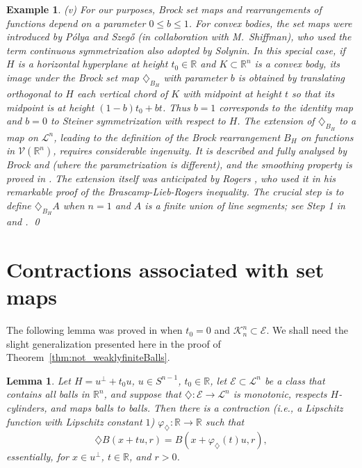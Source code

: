 \documentclass[12pt,reqno]{amsart}
\newcommand{\R}{{\mathbb R}}
\newcommand{\cL}{\mathcal L}
\newcommand{\cV}{{\mathcal V}}
\newtheorem{lem}[thm]{Lemma}
\newtheorem{ex}[thm]{Example}
\newcommand{\di}{\diamondsuit}
\numberwithin{equation}{section}
\begin{document}
\begin{ex}
{(v) For our purposes, {\em Brock} set maps and rearrangements of functions depend on a parameter $0\le b\le 1$.  For convex bodies, the set maps were introduced by P\'olya and Szeg\H{o} \cite[Note~B]{PS} (in collaboration with M.~Shiffman), who used the term {\em continuous symmetrization} also adopted by Solynin.  In this special case, if $H$ is a horizontal hyperplane at height $t_0\in \R$ and $K\subset \R^n$ is a convex body, its image under the Brock set map $\di_{B_H}$ with parameter $b$ is obtained by translating orthogonal to $H$ each vertical chord of $K$ with midpoint at height $t$ so that its midpoint is at height $(1-b)t_0+bt$.  Thus $b=1$ corresponds to the identity map and $b=0$ to Steiner symmetrization with respect to $H$.  The extension of $\di_{B_H}$ to a map on $\cL^n$, leading to the definition of the Brock rearrangement $B_H$ on functions in ${\cV}(\R^n)$, requires considerable ingenuity.  It is described and fully analysed by Brock \cite[Sections~2 and~3]{Bro1} and \cite[Section~2]{Bro2} (where the parametrization is different), and the smoothing property is proved in \cite[Remark~2.3]{Bro2}.  The extension itself was anticipated by Rogers \cite{Rog57}, who used it in his remarkable proof of the Brascamp-Lieb-Rogers inequality.  The crucial step is to define $\di_{B_H}A$ when $n=1$ and $A$ is a finite union of line segments; see Step 1 in \cite[pp.~165--166]{Bro2} and \cite[pp.~106--107]{Rog57}.
\qed}
\end{ex}


\section{Contractions associated with set maps}\label{Contractions}

The following lemma was proved in \cite[Lemma~6.2]{BGGK1} when $t_0=0$ and ${\mathcal{K}}^n_n\subset {\mathcal{E}}$.  We shall need the slight generalization presented here in the proof of Theorem~\ref{thm:not_weaklyfiniteBalls}.

\begin{lem}\label{lemm5}
Let $H=u^{\perp}+t_0 u$, $u\in S^{n-1}$, $t_0\in \R$, let ${\mathcal{E}}\subset {\mathcal{L}}^n$ be a class that contains all balls in $\R^n$, and suppose that $\di:{\mathcal{E}}\rightarrow {\mathcal{L}}^n$ is monotonic, respects $H$-cylinders, and maps balls to balls.  Then there is a contraction (i.e., a Lipschitz function with Lipschitz constant $1$) $\varphi_{\di}:\R\to\R$ such that
\begin{equation}\label{ball}
\di B(x+tu,r)=B\left(x+\varphi_{\di}(t)u,r\right),
\end{equation}
essentially, for $x\in u^\perp$, $t\in \R$, and $r>0$.
\end{lem}
\end{document}
